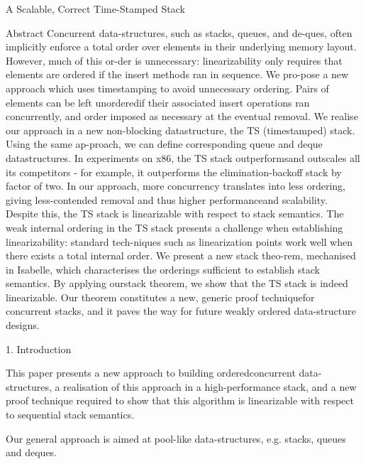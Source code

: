 A Scalable, Correct Time-Stamped Stack

Abstract
Concurrent data-structures, such as stacks, queues, and de-ques, often
implicitly enforce a total order over elements in their underlying memory
layout. 
However, much of this or-der is unnecessary: linearizability only requires that
elements are ordered if the insert methods ran in sequence. 
We pro-pose a new approach which uses timestamping to avoid unnecessary
ordering. 
Pairs of elements can be left unorderedif their associated insert operations
ran concurrently, and order imposed as necessary at the eventual removal.
We realise our approach in a new non-blocking datastructure, the TS
(timestamped) stack. 
Using the same ap-proach, we can define corresponding queue and deque
datastructures. 
In experiments on x86, the TS stack outperformsand outscales all its
competitors - for example, it outperforms the elimination-backoff stack by
factor of two. 
In our approach, more concurrency translates into less ordering, giving
less-contended removal and thus higher performanceand scalability. 
Despite this, the TS stack is linearizable with respect to stack semantics.
The weak internal ordering in the TS stack presents a challenge when
establishing linearizability: standard tech-niques such as linearization points
work well when there exists a total internal order. 
We present a new stack theo-rem, mechanised in Isabelle, which characterises
the orderings sufficient to establish stack semantics. 
By applying ourstack theorem, we show that the TS stack is indeed linearizable.
Our theorem constitutes a new, generic proof techniquefor concurrent stacks,
and it paves the way for future weakly ordered data-structure designs.

1. Introduction
 
This paper presents a new approach to building orderedconcurrent
data-structures, a realisation of this approach
in a high-performance stack, and a new proof technique required to show that
this algorithm is linearizable with respect to sequential stack semantics.

Our general approach is aimed at pool-like data-structures, e.g. stacks, queues
and deques. 

